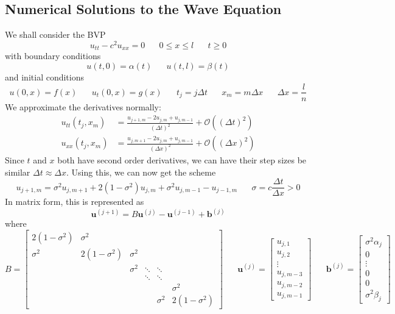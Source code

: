 \documentclass{article}
\newcommand{\vb}[1]{\mathbf{ #1}}
\newcommand{\twen}{\hspace{20pt}}
\numberwithin{equation}{section}
\begin{document}
\subsection{Numerical Solutions to the Wave Equation}
We shall consider the BVP 
\begin{equation*}
    u_{tt}-c^2u_{xx}=0 \twen 0\leq x\leq l \twen t\geq 0
\end{equation*}
with boundary conditions 
\begin{equation*}
    u(t,0)=\alpha(t) \twen u(t,l)=\beta(t)
\end{equation*}
and initial conditions 
\begin{equation*}
    u(0,x)=f(x) \twen u_t(0,x)=g(x) \twen t_j=j\Delta t \twen x_m=m\Delta x \twen \Delta x=\frac{l}{n}
\end{equation*}
We approximate the derivatives normally:
\begin{equation*}
    \begin{split}
        u_{tt}(t_j,x_m)&=\frac{u_{j+1,m}-2u_{j,m}+u_{j,m-1}}{(\Delta t)^2} + \mathcal{O}((\Delta t)^2)\\ u_{xx}(t_j,x_m)&=\frac{u_{j,m+1}-2u_{j,m}+u_{j,m-1}}{(\Delta x)^2}+\mathcal{O}((\Delta x)^2)
    \end{split}
\end{equation*}
Since $t$ and $x$ both have second order derivatives, we can have their step sizes be similar $\Delta t \approx \Delta x$. Using this, we can now get the scheme 
\begin{equation}
    u_{j+1,m}=\sigma^2u_{j,m+1}+2(1-\sigma^2)u_{j,m}+\sigma^2u_{j,m-1}-u_{j-1,m} \twen \sigma = c \frac{\Delta t}{\Delta x} >0
\end{equation}
In matrix form, this is represented as 
\begin{equation}
    \vb{u}^{(j+1)}=B\vb{u}^{(j)}-\vb{u}^{(j-1)}+\vb{b}^{(j)}
\end{equation}
where 
\begin{equation*}
    B=\begin{bmatrix}
        2(1-\sigma^2)&\sigma^2 \\\sigma^2&2(1-\sigma^2)&\sigma^2\\&&\sigma^2&\ddots&\ddots\\&&&\ddots&\ddots \\ &&&&&\sigma^2\\&&&&\sigma^2&2(1-\sigma^2)
    \end{bmatrix} \twen \vb{u}^{(j)} =\begin{bmatrix}
        u_{j,1}\\u_{j,2}\\\vdots\\ u_{j,m-3}\\u_{j,m-2}\\u_{j,m-1}
    \end{bmatrix}  \twen \vb{b}^{(j)} =\begin{bmatrix}
        \sigma^2 \alpha_j\\0\\ \vdots\\0\\0\\ \sigma^2\beta_j
    \end{bmatrix}
\end{equation*}
\end{document}
